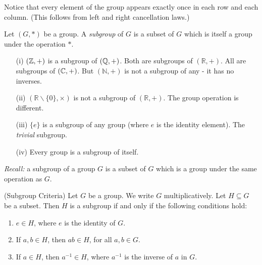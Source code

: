 \documentclass[twoside]{scrartcl}
\begin{document}
\begin{example}
Notice that every element of the group appears exactly once in each row and each column. (This follows from left and right cancellation laws.)
\end{example}\vspace*{10pt}




\begin{definition} Let $(G,*)$ be a group. A \emph{subgroup} of $G$ is a subset of $G$ which is itself a group under the operation $*$.	
\end{definition}\vspace*{10pt}


\begin{examples}\begin{enumerate}
 \item[(i)] $(\mathbb{Z},+)$ is a subgroup of $(\mathbb{Q},+)$. Both are subgroups of $(\mathbb{R},+)$. All are subgroups of $(\mathbb{C},+)$. But $(\mathbb{N},+)$
 is not a subgroup of any - it has no inverses.
 \item[(ii)] $(\mathbb{R} \backslash\{0\},\times)$ is not a subgroup of $(\mathbb{R},+)$. The group operation is different.
 \item[(iii)] $\{e\}$ is a subgroup of any group (where $e$ is the identity element). The \emph{trivial} subgroup.
 \item[(iv)] Every group is a subgroup of itself.
  \end{enumerate}
  \end{examples}\vspace*{10pt}

\emph{Recall:}  
a subgroup of a group $G$ is a subset of $G$ which is a group under the same operation as $G$.\\

\begin{proposition} (Subgroup Criteria) Let $G$ be a group. We write $G$ multiplicatively. Let $H \subseteq G$ be a subset. Then $H$ is a subgroup if and only if the following conditions hold:\begin{enumerate}
\item $e \in H$, where $e$ is the identity of $G$.
\item If $a,b \in H$, then $ab \in H$, for all $a,b \in G$.
\item If $a \in H$, then $a^{-1} \in H$, where $a^{-1}$ is the inverse of $a$ in $G$.	
\end{enumerate}
\end{proposition}
\end{document}
